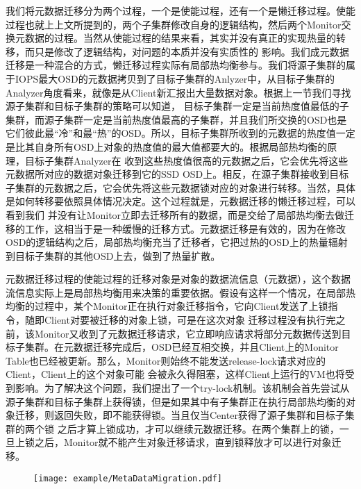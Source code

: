 我们将元数据迁移分为两个过程，一个是使能过程，还有一个是懒迁移过程。使能过程也就上上文所提到的，两个子集群修改自身的逻辑结构，然后两个Monitor交换元数据的过程。当然从使能过程的结果来看，其实并没有真正的实现热量的转移，而只是修改了逻辑结构，对问题的本质并没有实质性的
影响。我们成元数据迁移是一种混合的方式，懒迁移过程实际有局部热均衡参与。我们将源子集群的属于IOPS最大OSD的元数据拷贝到了目标子集群的Anlyzer中，从目标子集群的Analyzer角度看来，就像是从Client新汇报出大量数据对象。根据上一节我们寻找源子集群和目标子集群的策略可以知道，
目标子集群一定是当前热度值最低的子集群，而源子集群一定是当前热度值最高的子集群，并且我们所交换的OSD也是它们彼此最“冷”和最“热”的OSD。所以，目标子集群所收到的元数据的热度值一定是比其自身所有OSD上对象的热度值的最大值都要大的。根据局部热均衡的原理，目标子集群Analyzer在
收到这些热度值很高的元数据之后，它会优先将这些元数据所对应的数据对象迁移到它的SSD OSD上。相反，在源子集群接收到目标子集群的元数据之后，它会优先将这些元数据锁对应的对象进行转移。当然，具体是如何转移要依照具体情况决定。这个过程就是，元数据迁移的懒迁移过程，可以看到我们
并没有让Monitor立即去迁移所有的数据，而是交给了局部热均衡去做迁移的工作，这相当于是一种缓慢的迁移方式。元数据迁移是有效的，因为在修改OSD的逻辑结构之后，局部热均衡充当了迁移者，它把过热的OSD上的热量辐射到目标子集群的其他OSD上去，做到了热量扩散。

元数据迁移过程的使能过程的迁移对象是对象的数据流信息（元数据），这个数据流信息实际上是局部热均衡用来决策的重要依据。假设有这样一个情况，在局部热均衡的过程中，某个Monitor正在执行对象迁移指令，它向Client发送了上锁指令，随即Client对要被迁移的对象上锁，可是在这次对象
迁移过程没有执行完之前，该Monitor又收到了元数据迁移请求，它立即响应请求将部分元数据传送到目标子集群。在元数据迁移完成后，OSD已经互相交换，并且Client上的Monitor Table也已经被更新。那么，Monitor则始终不能发送release-lock请求对应的Client，Client上的这个对象可能
会被永久得阻塞，这样Client上运行的VM也将受到影响。为了解决这个问题，我们提出了一个try-lock机制。该机制会首先尝试从源子集群和目标子集群上获得锁，但是如果其中有子集群正在执行局部热均衡的对象迁移，则返回失败，即不能获得锁。当且仅当Center获得了源子集群和目标子集群的两个锁
之后才算上锁成功，才可以继续元数据迁移。在两个集群上的锁，一旦上锁之后，Monitor就不能产生对象迁移请求，直到锁释放才可以进行对象迁移。

\begin{figure}[!htp]
    \centering
    \texttt{[image: example/MetaDataMigration.pdf]}
\end{figure}

